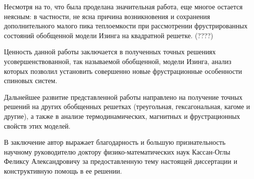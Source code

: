Несмотря на то, что была проделана значительная работа, еще многое остается неясным: в частности, не ясна причина возникновения и сохранения дополнительного малого пика теплоемкости при рассмотрении фрустрированных состояний обобщенной модели Изинга на квадратной решетке. (????)

Ценность данной работы заключается в полученных точных решениях усовершенствованной, так называемой обобщенной, модели Изинга, анализ которых позволил установить совершенно новые фрустрационные особенности спиновых систем.

Дальнейшее развитие представленной работы направлено на получение точных решений на других обобщенных решетках (треугольная, гексагональная, кагоме и другие), а также в анализе термодинамических, магнитных и фрустрационных свойств этих моделей.

В заключение автор выражает благодарность и большую признательность научному руководителю доктору физико-математических наук Кассан-Оглы Феликсу Александровичу за предоставленную тему настоящей диссертации и конструктивную помощь в ее решении. 
